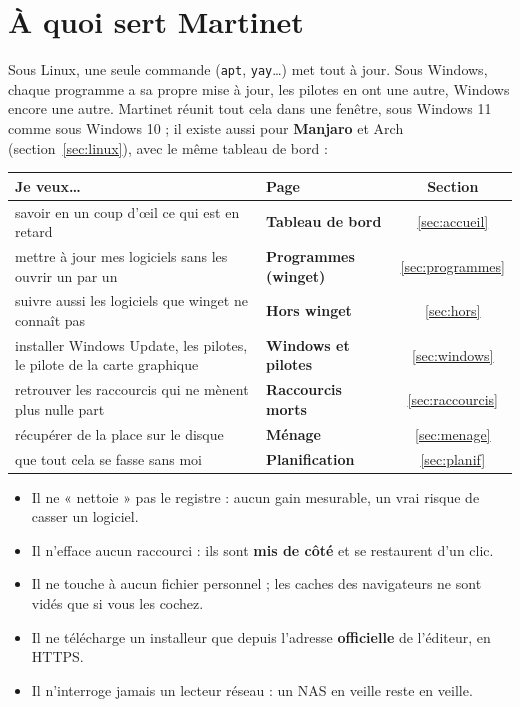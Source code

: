 \tableofcontents
\newpage

\section{À quoi sert Martinet}

Sous Linux, une seule commande (\texttt{apt}, \texttt{yay}…) met tout à jour. Sous Windows, chaque
programme a sa propre mise à jour, les pilotes en ont une autre, Windows encore une autre. Martinet
réunit tout cela dans une fenêtre, sous Windows 11 comme sous Windows 10 ; il existe aussi pour
\textbf{Manjaro} et Arch (section~\ref{sec:linux}), avec le même tableau de bord :

\begin{center}
\renewcommand{\arraystretch}{1.35}
\begin{tabularx}{\linewidth}{>{\raggedright\arraybackslash}X >{\sffamily\bfseries\color{bordeaux}}l c}
\toprule
\textbf{Je veux…} & \textbf{\color{ink}Page} & \textbf{Section} \\
\midrule
savoir en un coup d'œil ce qui est en retard & Tableau de bord & \ref{sec:accueil} \\
mettre à jour mes logiciels sans les ouvrir un par un & Programmes (winget) & \ref{sec:programmes} \\
suivre aussi les logiciels que winget ne connaît pas & Hors winget & \ref{sec:hors} \\
installer Windows Update, les pilotes, le pilote de la carte graphique & Windows et pilotes & \ref{sec:windows} \\
retrouver les raccourcis qui ne mènent plus nulle part & Raccourcis morts & \ref{sec:raccourcis} \\
récupérer de la place sur le disque & Ménage & \ref{sec:menage} \\
que tout cela se fasse sans moi & Planification & \ref{sec:planif} \\
\bottomrule
\end{tabularx}
\end{center}

\begin{securitebox}
\begin{itemize}
\item Il ne « nettoie » pas le registre : aucun gain mesurable, un vrai risque de casser un logiciel.
\item Il n'efface aucun raccourci : ils sont \textbf{mis de côté} et se restaurent d'un clic.
\item Il ne touche à aucun fichier personnel ; les caches des navigateurs ne sont vidés que si vous les cochez.
\item Il ne télécharge un installeur que depuis l'adresse \textbf{officielle} de l'éditeur, en HTTPS.
\item Il n'interroge jamais un lecteur réseau : un NAS en veille reste en veille.
\end{itemize}
\end{securitebox}

